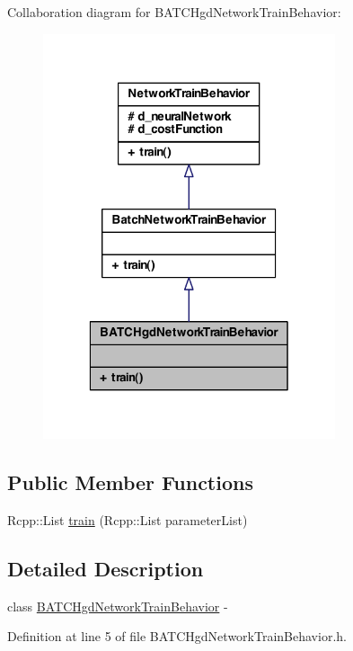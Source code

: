 Collaboration diagram for BATCHgdNetworkTrainBehavior:
\nopagebreak
\begin{figure}[H]
\begin{center}
\leavevmode
\includegraphics[width=244pt]{class_b_a_t_c_hgd_network_train_behavior__coll__graph}
\end{center}
\end{figure}
\subsection*{Public Member Functions}
\begin{DoxyCompactItemize}
\item 
Rcpp::List \hyperlink{class_b_a_t_c_hgd_network_train_behavior_af12d4bdca5962a8cc045e6ff8736c4b4}{train} (Rcpp::List parameterList)
\end{DoxyCompactItemize}


\subsection{Detailed Description}
class \hyperlink{class_b_a_t_c_hgd_network_train_behavior}{BATCHgdNetworkTrainBehavior} -\/ 

Definition at line 5 of file BATCHgdNetworkTrainBehavior.h.



